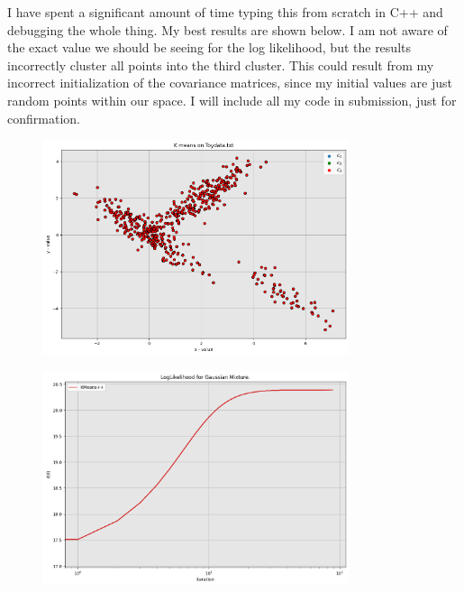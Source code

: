 \begin{solution}

    I have spent a significant amount of time typing this from scratch in C++ and debugging the whole thing. My best results are shown below. I am not aware of the exact value we should be seeing for the log likelihood, but the results incorrectly cluster all points into the third cluster. This could result from my incorrect initialization of the covariance matrices, since my initial values are just random points within our space. I will include all my code in submission, just for confirmation. 
\end{solution}

\newpage
\begin{figure}
    \centering
    \includegraphics[width = 0.8\textwidth]{Figure/gaussiancluster.png}
\end{figure}

\begin{figure}
    \centering
    \includegraphics[width = 0.8\textwidth]{Figure/loglikelihood.png}
\end{figure}

